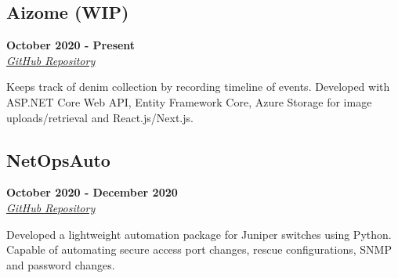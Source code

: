 \documentclass[10pt]{article}
\begin{document}
\begin{paracol}{2}
    \begin{leftcolumn} 
        \sloppy
        \subsection*{Aizome (WIP)}
        \textbf{October 2020 - Present} \\
        \textit{\href{https://github.com/dmtx97/Aizome}{\underline{GitHub Repository}}}
    \end{leftcolumn}
    \begin{rightcolumn} 
        \vspace{.2cm}
        \begin{flushleft} 
            Keeps track of denim collection by recording timeline of events. Developed with ASP.NET Core Web API, Entity Framework Core, Azure Storage for image uploads/retrieval and React.js/Next.js.        \end{flushleft}
        \vspace{-.6cm}
    \end{rightcolumn}    
\end{paracol}

\begin{paracol}{2}
    \begin{leftcolumn} 
        \sloppy
        \subsection*{NetOpsAuto}
        \textbf{October 2020 - December 2020} \\
        \textit{\href{https://github.com/dmtx97/netopsauto}{\underline{GitHub Repository}}}
    \end{leftcolumn}
    \begin{rightcolumn} 
        \vspace{.2cm}
        \begin{flushleft} 
            Developed a lightweight automation package for Juniper switches using Python. Capable of automating secure access port changes, rescue configurations, SNMP and password changes.
        \end{flushleft}
        \vspace{-.4cm}
    \end{rightcolumn}
\end{paracol}
\end{document}
